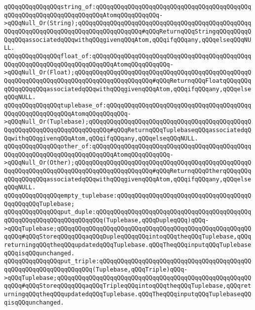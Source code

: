\verb|qQQqqQQqqQQqqQQqstring_of:qQQqqQQqqQQqqQQqqQQqqQQqqQQqqQQqqQQqqQQqqQQqqQQqqQQqqQQqqQQqqQQqqQQqqQQqAtomqQQqqQQqqQQq->qQQqNull_Or(String);qQQqqQQqqQQqqQQqqQQqqQQqqQQqqQQqqQQqqQQqqQQqqQQqqQQqqQQqqQQqqQQqqQQqqQQqqQQqqQQqqQQqqQQq#qQQqReturnqQQqStringqQQqqQQqqQQqqQQqassociatedqQQqwithqQQqgivenqQQqAtom,qQQqifqQQqany,qQQqelseqQQqNULL.|\newline
\verb|qQQqqQQqqQQqqQQqfloat_of:qQQqqQQqqQQqqQQqqQQqqQQqqQQqqQQqqQQqqQQqqQQqqQQqqQQqqQQqqQQqqQQqqQQqqQQqqQQqAtomqQQqqQQqqQQq->qQQqNull_Or(Float);qQQqqQQqqQQqqQQqqQQqqQQqqQQqqQQqqQQqqQQqqQQqqQQqqQQqqQQqqQQqqQQqqQQqqQQqqQQqqQQqqQQqqQQqqQQq#qQQqReturnqQQqFloatqQQqqQQqqQQqqQQqqQQqassociatedqQQqwithqQQqgivenqQQqAtom,qQQqifqQQqany,qQQqelseqQQqNULL.|\newline
\verb|qQQqqQQqqQQqqQQqtuplebase_of:qQQqqQQqqQQqqQQqqQQqqQQqqQQqqQQqqQQqqQQqqQQqqQQqqQQqqQQqqQQqAtomqQQqqQQqqQQq->qQQqNull_Or(Tuplebase);qQQqqQQqqQQqqQQqqQQqqQQqqQQqqQQqqQQqqQQqqQQqqQQqqQQqqQQqqQQqqQQqqQQqqQQqqQQq#qQQqReturnqQQqTuplebaseqQQqassociatedqQQqwithqQQqgivenqQQqAtom,qQQqifqQQqany,qQQqelseqQQqNULL.|\newline
\verb|qQQqqQQqqQQqqQQqother_of:qQQqqQQqqQQqqQQqqQQqqQQqqQQqqQQqqQQqqQQqqQQqqQQqqQQqqQQqqQQqqQQqqQQqqQQqqQQqAtomqQQqqQQqqQQq->qQQqNull_Or(Other);qQQqqQQqqQQqqQQqqQQqqQQqqQQqqQQqqQQqqQQqqQQqqQQqqQQqqQQqqQQqqQQqqQQqqQQqqQQqqQQqqQQqqQQqqQQq#qQQqReturnqQQqOtherqQQqqQQqqQQqqQQqqQQqassociatedqQQqwithqQQqgivenqQQqAtom,qQQqifqQQqany,qQQqelseqQQqNULL.|\newline
\newline
\verb|qQQqqQQqqQQqqQQqempty_tuplebase:qQQqqQQqqQQqqQQqqQQqqQQqqQQqqQQqqQQqqQQqqQQqqQQqTuplebase;|\newline
\newline
\verb|qQQqqQQqqQQqqQQqput_duple:qQQqqQQqqQQqqQQqqQQqqQQqqQQqqQQqqQQqqQQqqQQqqQQqqQQqqQQqqQQqqQQqqQQqqQQq(Tuplebase,qQQqDupleqQQq)qQQq->qQQqTuplebase;qQQqqQQqqQQqqQQqqQQqqQQqqQQqqQQqqQQqqQQqqQQqqQQqqQQqqQQqqQQq#qQQqStoreqQQqqQQqaqQQqDupleqQQqqQQqintoqQQqtheqQQqTuplebase,qQQqreturningqQQqtheqQQqupdatedqQQqTuplebase.qQQqTheqQQqinputqQQqTuplebaseqQQqisqQQqunchanged.|\newline
\verb|qQQqqQQqqQQqqQQqput_triple:qQQqqQQqqQQqqQQqqQQqqQQqqQQqqQQqqQQqqQQqqQQqqQQqqQQqqQQqqQQqqQQqqQQq(Tuplebase,qQQqTriple)qQQq->qQQqTuplebase;qQQqqQQqqQQqqQQqqQQqqQQqqQQqqQQqqQQqqQQqqQQqqQQqqQQqqQQqqQQq#qQQqStoreqQQqqQQqaqQQqTripleqQQqintoqQQqtheqQQqTuplebase,qQQqreturningqQQqtheqQQqupdatedqQQqTuplebase.qQQqTheqQQqinputqQQqTuplebaseqQQqisqQQqunchanged.|\newline
\newline
